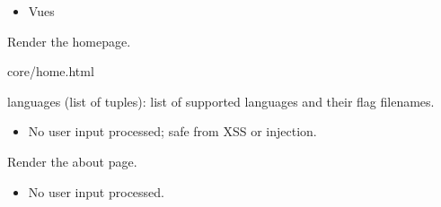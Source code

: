 \documentclass[letterpaper,10pt,english]{sphinxmanual}
\begin{document}
\begin{itemize}
\item {} 
\sphinxAtStartPar
Vues

\end{itemize}
\label{\detokenize{index:module-core.views}}

\begin{fulllineitems}
\label{\detokenize{index:core.views.home_view}}
\pysigstartsignatures
\pysiglinewithargsret
{}
{}
{}
\pysigstopsignatures
\sphinxAtStartPar
Render the homepage.
\begin{description}
\sphinxAtStartPar
core/home.html

\sphinxAtStartPar
languages (list of tuples): list of supported languages and their flag filenames.

\begin{itemize}
\item {} 
\sphinxAtStartPar
No user input processed; safe from XSS or injection.

\end{itemize}

\end{description}

\end{fulllineitems}


\begin{fulllineitems}
\label{\detokenize{index:core.views.about_view}}
\pysigstartsignatures
\pysiglinewithargsret
{}
{}
{}
\pysigstopsignatures
\sphinxAtStartPar
Render the about page.
\begin{description}
\begin{itemize}
\item {} 
\sphinxAtStartPar
No user input processed.

\end{itemize}

\end{description}

\end{fulllineitems}
\end{document}
